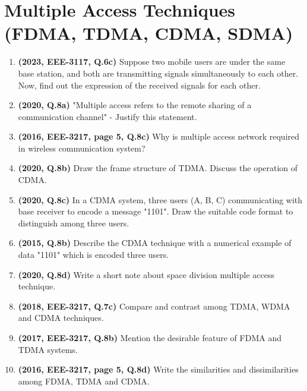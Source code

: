 \documentclass[12pt, a4paper]{article}
\begin{document}
	\section{Multiple Access Techniques (FDMA, TDMA, CDMA, SDMA)}
	\begin{enumerate}
		\item \textbf{(2023, EEE-3117, Q.6c)} Suppose two mobile users are under the same base station, and both are transmitting signals simultaneously to each other. Now, find out the expression of the received signals for each other.
		\item \textbf{(2020, Q.8a)} "Multiple access refers to the remote sharing of a communication channel" - Justify this statement.
		\item \textbf{(2016, EEE-3217, page 5, Q.8c)} Why is multiple access network required in wireless communication system?
		
		\item \textbf{(2020, Q.8b)} Draw the frame structure of TDMA. Discuss the operation of CDMA.
		
		\item \textbf{(2020, Q.8c)} In a CDMA system, three users (A, B, C) communicating with base receiver to encode a message "1101". Draw the suitable code format to distinguish among three users.
		\item \textbf{(2015, Q.8b)} Describe the CDMA technique with a numerical example of data "1101" which is encoded three users.
		
		\item \textbf{(2020, Q.8d)} Write a short note about space division multiple access technique.
		
		\item \textbf{(2018, EEE-3217, Q.7c)} Compare and contrast among TDMA, WDMA and CDMA techniques.
		
		\item \textbf{(2017, EEE-3217, Q.8b)} Mention the desirable feature of FDMA and TDMA systems.
		
		\item \textbf{(2016, EEE-3217, page 5, Q.8d)} Write the similarities and dissimilarities among FDMA, TDMA and CDMA.
		
	\end{enumerate}
	
\end{document}

